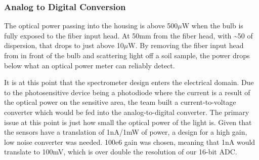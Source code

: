 \documentclass[journal]{IEEEtran}
\begin{document}
\subsubsection{Analog to Digital Conversion}
The optical power passing into the housing is above 500$\mu $W when the bulb is fully exposed to the fiber input head. At 50mm from the fiber head, with \~{}50\textdegree \: of dispersion, that drops to just above 10$\mu $W. By removing the fiber input head from in front of the bulb and scattering light off a soil sample, the power drops below what an optical power meter can reliably detect. 

It is at this point that the spectrometer design enters the electrical domain. Due to the photosensitive device being a photodiode where the current is a result of the optical power on the sensitive area, the team built a current-to-voltage converter which would be fed into the analog-to-digital converter. The primary issue at this point is just how small the optical power of the light is. Given that the sensors have a translation of 1nA/1mW of power, a design for a high gain, low noise converter was needed. 100e6 gain was chosen, meaning that 1nA would translate to 100mV, which is over double the resolution of our 16-bit ADC.
\end{document}
